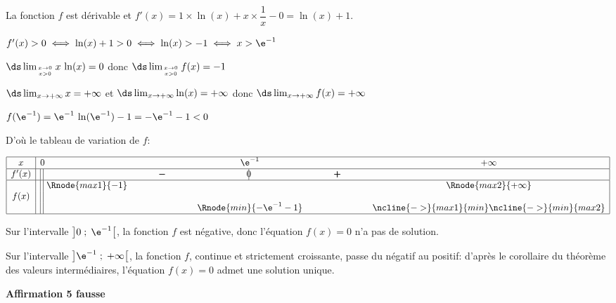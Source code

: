 \begin{enumerate}
\begin{list}{\textbullet}{}
\item La fonction $f$ est dérivable et $f'(x)=1\times \ln(x) + x\times \dfrac{1}{x}-0=\ln(x)+1$.
\item $f'(x)>0 \iff \ln(x) +1>0 \iff \ln(x)>-1 \iff x>\e^{-1}$
\item $\ds\lim_{x\to 0 \atop x>0} x\,\ln(x)=0$ donc $\ds\lim_{x\to 0 \atop x>0} f(x)=-1$
\item $\ds\lim_{x\to +\infty} x =+\infty$ et $\ds\lim_{x\to +\infty} \ln(x)=+\infty$ donc $\ds\lim_{x\to +\infty} f(x)=+\infty$
\item  $f(\e^{-1})=\e^{-1}\,\ln(\e^{-1})-1 = -\e^{-1}-1<0$
\end{list}

D'où le tableau de variation de $f$:

\begin{center}
{\renewcommand{\arraystretch}{1.1}
\def\esp{\hspace*{2cm}}%
\def\hauteur{0pt}%
$\begin{array}{|c| l  *4{c}|}
\hline
 x & 0 & \esp & \e^{-1} & \esp & +\infty \\
 \hline
f'(x) & \vline\;\vline &  \pmb{-} & \vline\hspace{-2.7pt}0 & \pmb{+} & \\  
\hline
  & \vline\;\vline~\Rnode{max1}{-1}  &  &  &  & \Rnode{max2}{+\infty} \\
f(x) &\vline\;\vline &  & & &  \rule{0pt}{\hauteur} \\
 & \vline\;\vline & &   \Rnode{min}{-\e^{-1}-1} & & \rule{0pt}{\hauteur}
\ncline{->}{max1}{min} \ncline{->}{min}{max2}\\
\hline
\end{array}$
}
\end{center}	

Sur l'intervalle $\left ]0\;;\;\e^{-1}\strut\right [$, la fonction $f$ est négative, donc l'équation $f(x)=0$ n'a pas de solution.

Sur l'intervalle $\left ]\e^{-1}\;;\; +\infty\strut\right [$, la fonction $f$, continue et strictement croissante, passe du négatif au positif: d'après le corollaire du théorème des valeurs intermédiaires, l'équation $f(x)=0$ admet une solution unique.

\hfill\textbf{Affirmation 5 fausse}
\end{enumerate}


